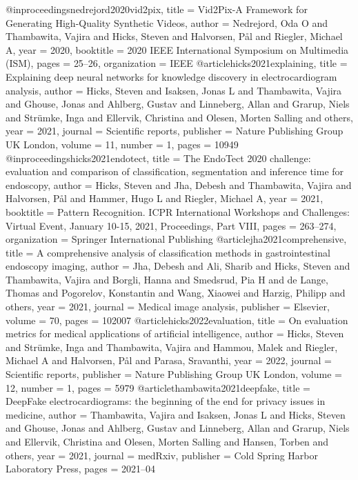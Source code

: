 @inproceedings{nedrejord2020vid2pix,
	title = {Vid2Pix-A Framework for Generating High-Quality Synthetic Videos},
	author = {Nedrejord, Oda O and Thambawita, Vajira and Hicks, Steven and Halvorsen, P{\aa}l and Riegler, Michael A},
	year = 2020,
	booktitle = {2020 IEEE International Symposium on Multimedia (ISM)},
	pages = {25--26},
	organization = {IEEE}
}
@article{hicks2021explaining,
	title = {Explaining deep neural networks for knowledge discovery in electrocardiogram analysis},
	author = {Hicks, Steven and Isaksen, Jonas L and Thambawita, Vajira and Ghouse, Jonas and Ahlberg, Gustav and Linneberg, Allan and Grarup, Niels and Str{\"u}mke, Inga and Ellervik, Christina and Olesen, Morten Salling and others},
	year = 2021,
	journal = {Scientific reports},
	publisher = {Nature Publishing Group UK London},
	volume = 11,
	number = 1,
	pages = 10949
}
@inproceedings{hicks2021endotect,
	title = {The EndoTect 2020 challenge: evaluation and comparison of classification, segmentation and inference time for endoscopy},
	author = {Hicks, Steven and Jha, Debesh and Thambawita, Vajira and Halvorsen, P{\aa}l and Hammer, Hugo L and Riegler, Michael A},
	year = 2021,
	booktitle = {Pattern Recognition. ICPR International Workshops and Challenges: Virtual Event, January 10-15, 2021, Proceedings, Part VIII},
	pages = {263--274},
	organization = {Springer International Publishing}
}
@article{jha2021comprehensive,
	title = {A comprehensive analysis of classification methods in gastrointestinal endoscopy imaging},
	author = {Jha, Debesh and Ali, Sharib and Hicks, Steven and Thambawita, Vajira and Borgli, Hanna and Smedsrud, Pia H and de Lange, Thomas and Pogorelov, Konstantin and Wang, Xiaowei and Harzig, Philipp and others},
	year = 2021,
	journal = {Medical image analysis},
	publisher = {Elsevier},
	volume = 70,
	pages = 102007
}
@article{hicks2022evaluation,
	title = {On evaluation metrics for medical applications of artificial intelligence},
	author = {Hicks, Steven and Str{\"u}mke, Inga and Thambawita, Vajira and Hammou, Malek and Riegler, Michael A and Halvorsen, P{\aa}l and Parasa, Sravanthi},
	year = 2022,
	journal = {Scientific reports},
	publisher = {Nature Publishing Group UK London},
	volume = 12,
	number = 1,
	pages = 5979
}
@article{thambawita2021deepfake,
	title = {DeepFake electrocardiograms: the beginning of the end for privacy issues in medicine},
	author = {Thambawita, Vajira and Isaksen, Jonas L and Hicks, Steven and Ghouse, Jonas and Ahlberg, Gustav and Linneberg, Allan and Grarup, Niels and Ellervik, Christina and Olesen, Morten Salling and Hansen, Torben and others},
	year = 2021,
	journal = {medRxiv},
	publisher = {Cold Spring Harbor Laboratory Press},
	pages = {2021--04}
}
